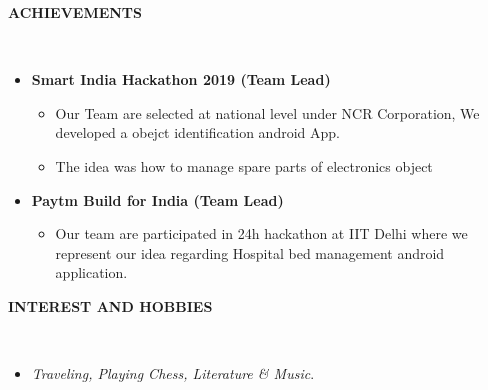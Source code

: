 \documentclass[a4paper,11pt]{article}
\newcommand{\isep}{-2 pt}
\newcommand{\lsep}{-0.5cm}
\newcommand{\resheading}[1]{{\small \colorbox{mygrey}{\begin{minipage}{0.975\textwidth}{\textbf{#1 \vphantom{p\^{E}}}}\end{minipage}}}}
\begin{document}
\resheading{\textbf{ACHIEVEMENTS} }\\[\lsep]
 \begin{itemize}
 \item \textbf{Smart India Hackathon 2019 (Team Lead)}
	\begin{itemize}\itemsep \isep
	\item Our Team are selected at national level under NCR Corporation, We developed a obejct identification android App.
	\item The idea was how to manage spare parts of electronics object
	\end{itemize}
\end{itemize}  
 \begin{itemize}
 \item \textbf{Paytm Build for India (Team Lead)}
	\begin{itemize}\itemsep \isep
	\item Our team are participated in 24h hackathon at IIT Delhi where we represent our idea regarding Hospital bed management android application.
	\end{itemize}
\end{itemize}  

\resheading{\textbf{INTEREST AND HOBBIES} }\\[\lsep]
 
\begin{itemize}
\item[] \noindent \textit{Traveling, Playing Chess, Literature \& Music}.

\end{itemize}  
\end{document}
